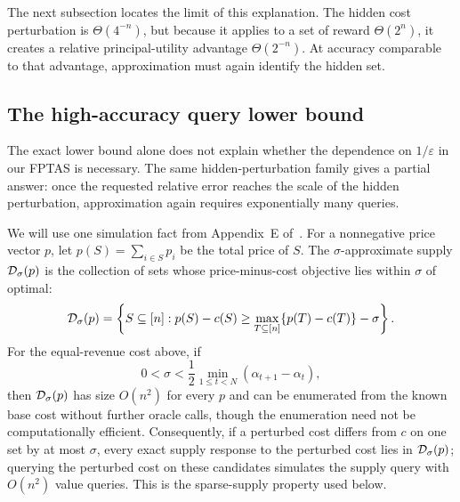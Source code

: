 \documentclass[11pt]{article}
\newcommand{\eps}{\varepsilon}
\begin{document}
The next subsection locates the limit of this explanation.  The hidden cost
perturbation is $\Theta(4^{-n})$, but because it applies to a set of reward
$\Theta(2^n)$, it creates a relative principal-utility advantage
$\Theta(2^{-n})$.  At accuracy comparable to that advantage, approximation
must again identify the hidden set.

\subsection{The high-accuracy query lower bound}

The exact lower bound alone does not explain whether the dependence on
$1/\eps$ in our FPTAS is necessary.  The same hidden-perturbation family
gives a partial answer: once the requested relative error reaches the scale
of the hidden perturbation, approximation again requires exponentially many
queries.

We will use one simulation fact from Appendix~E
of~\cite{DFGR26}.  For a nonnegative price vector $p$, let
$p(S)=\sum_{i\in S}p_i$ be the total price of $S$.  The $\sigma$-approximate
supply ${\cal D}_\sigma(p)$ is the collection of sets whose price-minus-cost
objective lies within $\sigma$ of optimal:
\[
 {\cal D}_\sigma(p)=
 \left\{S\subseteq[n]:
 p(S)-c(S)\geq
 \max_{T\subseteq[n]}\{p(T)-c(T)\}-\sigma\right\}.
\]
For the equal-revenue cost above, if
\[
 0<\sigma<
 \frac12\min_{1\leq t<N}(\alpha_{t+1}-\alpha_t),
\]
then ${\cal D}_\sigma(p)$ has size $O(n^2)$ for every $p$ and can be
enumerated from the known base cost without further oracle calls, though
the enumeration need not be computationally efficient.  Consequently, if a
perturbed cost
differs from $c$ on one set by at most $\sigma$, every exact supply response
to the perturbed cost lies in ${\cal D}_\sigma(p)$; querying the perturbed
cost on these candidates simulates the supply query with $O(n^2)$ value
queries.  This is the sparse-supply property used below.
\end{document}
